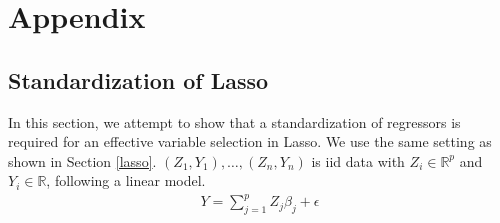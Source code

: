 \section{Appendix}\label{appendix}
    \subsection{Standardization of Lasso}\label{standardization_of_lasso}
         In this section, we attempt to show that a standardization of regressors is required for an effective variable selection in Lasso. We use the same setting as shown in Section \ref{lasso}. $(Z_1, Y_1), \ldots, (Z_n,Y_n)$ is iid data with $Z_i \in \mathbb{R}^p$ and $Y_i \in \mathbb{R}$, following a linear model.
        \begin{align*}\label{linear_model}
            Y=\sum\limits_{j=1}^p Z_j\beta_j+\epsilon
        \end{align*}

